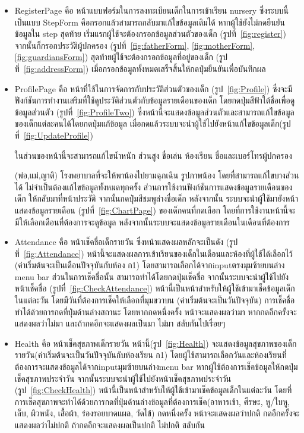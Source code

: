 \begin{itemize}
  \item RegisterPage คือ หน้าแบบฟอร์มในการลงทะเบียนเด็กในการเข้าเรียน nursery 
  ซึ่งระบบนี้เป็นแบบ StepForm คือกรอกแล้วสามารถกลับมาแก้ไขข้อมูลเดิมได้ หากผู้ใช้ยังไม่กดยืนยันข้อมูลใน step สุดท้าย
  เริ่มแรกผู้ใช้จะต้องกรอกข้อมูลส่วนตัวของเด็ก (รูปที่~\ref{fig:register}) 
  จากนั้นก็กรอกประวัติผู้ปกครอง (รูปที่~\ref{fig:fatherForm}, \ref{fig:motherForm}, \ref{fig:guardiansForm})
  สุดท้ายผู้ใช้จะต้องกรอกข้อมูลที่อยู่ของเด็ก (รูปที่~\ref{fig:addressForm}) เมื่อกรอกข้อมูลทั้งหมดเสร็จสิ้นให้กดปุ่มยืนยันเพื่อบันทึกผล
  
  \item  ProfilePage คือ หน้าที่ใช้ในการจัดการกับประวัติส่วนตัวของเด็ก (รูป~\ref{fig:Profile}) ซึ่งจะมีฟังก์ชันการทำงานเสริมที่ใช้ดูประวัติส่วนตัวกับข้อมูลรายเดือนของเด็ก
  โดยกดปุ่มสีฟ้าใต้ชื่อเพื่อดูข้อมูลส่วนตัว (รูปที่~\ref{fig:ProfileTwo}) ซึ่งหน้านี้จะแสดงข้อมูลส่วนตัวและสามารถแก้ไขข้อมูลของเด็กแต่ละคนได้โดยกดปุ่มแก้ข้อมูล เมื่อกดแล้วระบบจะนำผู้ใช้ไปยังหน้าแก้ไขข้อมูลเด็ก(รูปที่~\ref{fig:UpdateProfile}) 
  
  ในส่วนของหน้านี้จะสามารถแก้ไขน้ำหนัก ส่วนสูง ชื่อเล่น ห้องเรียน ชื่อและเบอร์โทรผู้ปกครอง 
  
  (พ่อ,แม่,ญาติ) โรงพยาบาลที่จะให้พาน้องไปยามฉุกเฉิน รูปภาพน้อง โดยที่สามารถแก้ไขบางส่วนได้ ไม่จำเป็นต้องแก้ไขข้อมูลทั้งหมดทุกครั้ง 
  ส่วนการใช้งานฟังก์ชันการแสดงข้อมูลรายเดือนของเด็ก ให้กลับมาที่หน้าประวัติ จากนั้นกดปุ่มสีชมพูล่างชื่อเด็ก หลังจากนั้น
  ระบบจะนำผู้ใช้มายังหน้าแสดงข้อมูลรายเดือน (รูปที่~\ref{fig:ChartPage}) ของเด็กคนที่กดเลือก โดยที่การใช้งานหน้านี้จะมีให้เลือกเดือนที่ต้องการจะดูข้อมูล หลังจากนั้นระบบจะแสดงข้อมูลรายเดือนในเดือนที่ต้องการ
  
  \item  Attendance คือ หน้าเช็คชื่อเด็กรายวัน ซึ่งหน้าแสดงผลหลักจะเป็นดัง (รูปที่~\ref{fig:Attendance}) หน้านี้จะแสดงผลการเข้าเรียนของเด็กในเดือนและห้องที่ผู้ใช้ได้เลือกไว้ (ค่าเริ่มต้นจะเป็นเดือนปัจจุบันกับห้อง ก1) 
  โดยสามารถเลือกได้จากinputตรงมุมซ้ายบนล่าง menu bar ส่วนในการเช็คชื่อนั้น สามารถทำได้โดยกดปุ่มเช็คชื่อ
  จากนั้นระบบจะนำผู้ใช้ไปยังหน้าเช็คชื่อ (รูปที่~\ref{fig:CheckAttendance}) หน้านี้เป็นหน้าสำหรับให้ผู้ใช้เข้ามาเช็คข้อมูลเด็กในแต่ละวัน โดยมีวันที่ต้องการเช็คให้เลือกที่มุมขวาบน (ค่าเริ่มต้นจะเป็นวันปัจจุบัน) การเช็คชื่อทำได้ด้วยการกดที่ปุ่มด้านล่างสถานะ โดยหากกดหนึ่งครั้ง
  หน้าจะแสดงผลว่ามา หากกดอีกครั้งจะแสดงผลว่าไม่มา และถ้ากดอีกจะแสดงผลเป็นมา ไม่มา สลับกันไปเรื่อยๆ

  \item  Health คือ หน้าเช็คสุขภาพเด็กรายวัน หน้านี้(รูป~\ref{fig:Health}) จะแสดงข้อมูลสุขภาพของเด็กรายวัน(ค่าเริ่มต้นจะเป็นวันปัจจุบันกับห้องเรียน ก1) โดยผู้ใช้สามารถเลือกวันและห้องเรียนที่ต้องการจะแสดงข้อมูลได้จากinputมุมซ้ายบนล่างmenu bar 
  หากผู้ใช้ต้องการเช็คข้อมูลให้กดปุ่มเช็คสุขภาพประจำวัน จากนั้นระบบจะนำผู้ใช้ไปยังหน้าเช็คสุขภาพประจำวัน (รูป~\ref{fig:CheckHealth}) 
  หน้านี้เป็นหน้าสำหรับให้ผู้ใช้เข้ามาเช็คข้อมูลเด็กในแต่ละวัน โดยที่การเช็คสุขภาพจะทำได้ด้วยการกดที่ปุ่มด้านล่างข้อมูลที่ต้องการเช็ค(อาหารเช้า, ศีรษะ, หู/ใบหู, เล็บ, ผิวหนัง, เสื้อผ้า, ร่องรอยบาดแผล, วัดไข้) กดหนึ่งครั้ง
  หน้าจะแสดงผลว่าปกติ กดอีกครั้งจะแสดงผลว่าไม่ปกติ ถ้ากดอีกจะแสดงผลเป็นปกติ ไม่ปกติ สลับกัน



\end{itemize}

